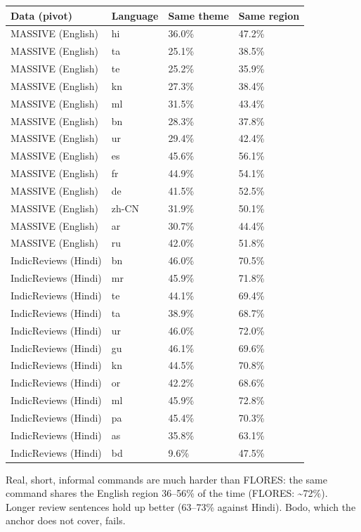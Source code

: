 \documentclass[
  10pt,
]{article}
\begin{document}
\begin{longtable}[]{@{}llll@{}}
\toprule\noalign{}
Data (pivot) & Language & Same theme & Same region \\
\midrule\noalign{}
\endhead
\bottomrule\noalign{}
\endlastfoot
MASSIVE (English) & hi & 36.0\% & 47.2\% \\
MASSIVE (English) & ta & 25.1\% & 38.5\% \\
MASSIVE (English) & te & 25.2\% & 35.9\% \\
MASSIVE (English) & kn & 27.3\% & 38.4\% \\
MASSIVE (English) & ml & 31.5\% & 43.4\% \\
MASSIVE (English) & bn & 28.3\% & 37.8\% \\
MASSIVE (English) & ur & 29.4\% & 42.4\% \\
MASSIVE (English) & es & 45.6\% & 56.1\% \\
MASSIVE (English) & fr & 44.9\% & 54.1\% \\
MASSIVE (English) & de & 41.5\% & 52.5\% \\
MASSIVE (English) & zh-CN & 31.9\% & 50.1\% \\
MASSIVE (English) & ar & 30.7\% & 44.4\% \\
MASSIVE (English) & ru & 42.0\% & 51.8\% \\
IndicReviews (Hindi) & bn & 46.0\% & 70.5\% \\
IndicReviews (Hindi) & mr & 45.9\% & 71.8\% \\
IndicReviews (Hindi) & te & 44.1\% & 69.4\% \\
IndicReviews (Hindi) & ta & 38.9\% & 68.7\% \\
IndicReviews (Hindi) & ur & 46.0\% & 72.0\% \\
IndicReviews (Hindi) & gu & 46.1\% & 69.6\% \\
IndicReviews (Hindi) & kn & 44.5\% & 70.8\% \\
IndicReviews (Hindi) & or & 42.2\% & 68.6\% \\
IndicReviews (Hindi) & ml & 45.9\% & 72.8\% \\
IndicReviews (Hindi) & pa & 45.4\% & 70.3\% \\
IndicReviews (Hindi) & as & 35.8\% & 63.1\% \\
IndicReviews (Hindi) & bd & 9.6\% & 47.5\% \\
\end{longtable}

Real, short, informal commands are much harder than FLORES: the same
command shares the English region 36--56\% of the time (FLORES:
\textasciitilde72\%). Longer review sentences hold up better (63--73\%
against Hindi). Bodo, which the anchor does not cover, fails.
\end{document}
